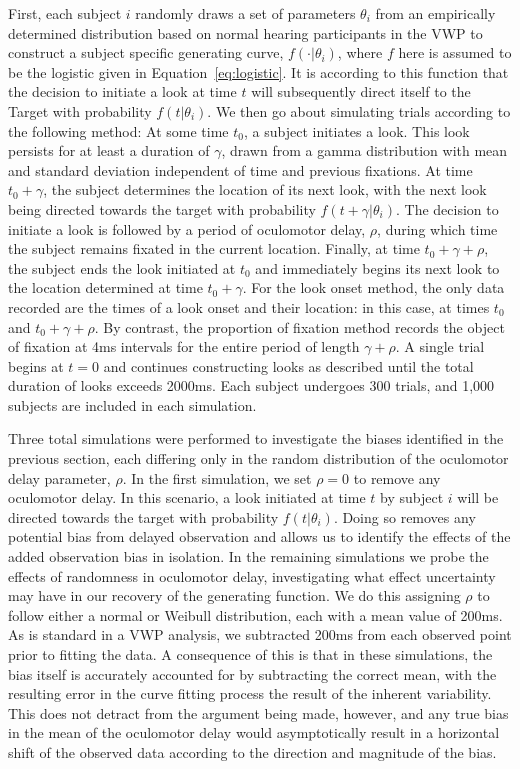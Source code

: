 First, each subject $i$ randomly draws a set of parameters $\theta_i$ from an empirically determined distribution based on normal hearing participants in the VWP \cite{FarrisTrimble2014} to construct a subject specific generating curve, $f(\cdot | \theta_i)$, where $f$ here is assumed to be the logistic given in Equation~\ref{eq:logistic}.   It is according to this function that the decision to initiate a look at time $t$ will subsequently direct itself to the Target with probability $f(t|\theta_i)$. We then go about simulating trials according to the following method: At some time $t_0$, a subject initiates a look. This look persists for at least a duration of $\gamma$, drawn from a gamma distribution with mean and standard deviation independent of time and previous fixations. At time $t_0+\gamma$, the subject determines the location of its next look, with the next look being directed towards the target with probability $f(t+\gamma | \theta_i)$. The decision to initiate a look is followed by a period of oculomotor delay, $\rho$, during which time the subject remains fixated in the current location. Finally, at time $t_0 + \gamma + \rho$, the subject ends the look initiated at $t_0$ and immediately begins its next look to the location determined at time $t_0 + \gamma$. For the look onset method, the only data recorded are the times of a look onset and their location: in this case, at times $t_0$ and $t_0 + \gamma + \rho$. By contrast, the proportion of fixation method records the object of fixation at 4ms intervals for the entire period of length $\gamma + \rho$. A single trial begins at $t = 0$ and continues constructing looks as described until the total duration of looks exceeds 2000ms. Each subject undergoes 300 trials, and 1,000 subjects are included in each simulation.

Three total simulations were performed to investigate the biases identified in the previous section, each differing only in the random distribution of the oculomotor delay parameter, $\rho$. In the first simulation, we set $\rho = 0$ to remove any oculomotor delay. In this scenario, a look initiated at time $t$ by subject $i$ will be directed towards the target with probability $f(t|\theta_i)$. Doing so removes any potential bias from delayed observation and allows us to identify the effects of the added observation bias in isolation. In the remaining simulations we probe the effects of randomness in oculomotor delay, investigating what effect uncertainty may have in our recovery of the generating function. We do this assigning $\rho$ to follow either a normal or Weibull distribution, each with a mean value of 200ms. As is standard in a VWP analysis, we subtracted 200ms from each observed point prior to fitting the data. A consequence of this is that in these simulations, the bias itself is accurately accounted for by subtracting the correct mean, with the resulting error in the curve fitting process the result of the inherent variability. This does not detract from the argument being made, however, and any true bias in the mean of the oculomotor delay would asymptotically result in a horizontal shift of the observed data according to the direction and magnitude of the bias.

